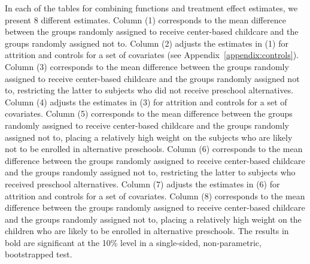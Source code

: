 In each of the tables for combining functions and treatment effect estimates, we present 8 different estimates. Column (1) corresponds to the mean difference between the groups randomly assigned to receive center-based childcare and the groups randomly assigned not to. Column (2) adjusts the estimates in (1) for attrition and controls for a set of covariates (see Appendix~\ref{appendix:controls}). Column (3) corresponds to the mean difference between the groups randomly assigned to receive center-based childcare and the groups randomly assigned not to, restricting the latter to subjects who did not receive preschool alternatives. Column (4) adjusts the estimates in (3) for attrition and controls for a set of covariates. Column (5) corresponds to the mean difference between the groups randomly assigned to receive center-based childcare and the groups randomly assigned not to, placing a relatively high weight on the subjects who are likely not to be enrolled in alternative preschools. Column (6) corresponds to the mean difference between the groups randomly assigned to receive center-based childcare and the groups randomly assigned not to, restricting the latter to subjects who received preschool alternatives. Column (7) adjusts the estimates in (6) for attrition and controls for a set of covariates. Column (8) corresponds to the mean difference between the groups randomly assigned to receive center-based childcare and the groups randomly assigned not to, placing a relatively high weight on the children who are likely to be enrolled in alternative preschools. The results in bold are significant at the 10\% level in a single-sided, non-parametric, bootstrapped test.







%
%
%
%
%
%



